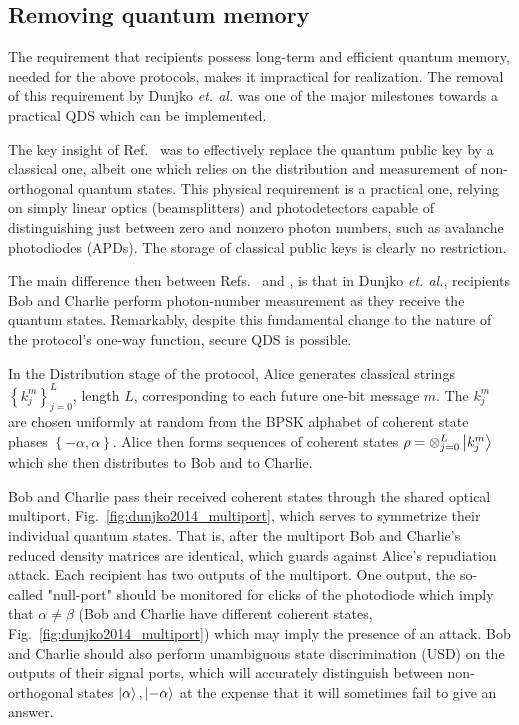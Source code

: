 \subsection*{Removing quantum memory}
The requirement that recipients possess long-term and efficient quantum memory, needed for the above protocols, makes it impractical for realization. The removal of this requirement by Dunjko \emph{et. al.} \cite{Dunjko2014} was one of the major milestones towards a practical QDS which can be implemented. 

The key insight of Ref.~\cite{Dunjko2014} was to effectively replace the quantum public key by a classical one, albeit one which relies on the distribution and measurement of non-orthogonal quantum states. This physical requirement is a practical one, relying on simply linear optics (beamsplitters) and photodetectors capable of distinguishing just between zero and nonzero photon numbers, such as avalanche photodiodes (APDs). The storage of classical public keys is clearly no restriction. 

The main difference then between Refs.~\cite{Dunjko2014} and \cite{Gottesman2001}, is that in Dunjko \emph{et. al.}, recipients Bob and Charlie perform photon-number measurement as they receive the quantum states. Remarkably, despite this fundamental change to the nature of the protocol's one-way function, secure QDS is possible. 


In the Distribution stage of the protocol, Alice generates classical strings $\left\{k_j^m\right\}_{j=0}^L$, length $L$, corresponding to each future one-bit message $m$. The $k_j^m$ are chosen uniformly at random from the BPSK alphabet of coherent state phases $\left\{- \alpha, \alpha\right\}$. Alice then forms sequences of coherent states $\rho = \otimes_{j=0}^L \ket{k_j^m}$ which she then distributes to Bob and to Charlie. 



Bob and Charlie pass their received coherent states through the shared optical multiport, Fig.~\ref{fig:dunjko2014_multiport}, which serves to symmetrize their individual quantum states. That is, after the multiport Bob and Charlie's reduced density matrices are identical, which guards against Alice's repudiation attack. Each recipient has two outputs of the multiport. One output, the so-called "null-port" should be monitored for clicks of the photodiode which imply that $\alpha \ne \beta$ (Bob and Charlie have different coherent states, Fig.~\ref{fig:dunjko2014_multiport}) which may imply the presence of an attack. Bob and Charlie should also perform unambiguous state discrimination (USD) on the outputs of their signal ports, which will accurately distinguish between non-orthogonal states $\ket{\alpha}, \ket{-\alpha}$ at the expense that it will sometimes fail to give an answer. 

